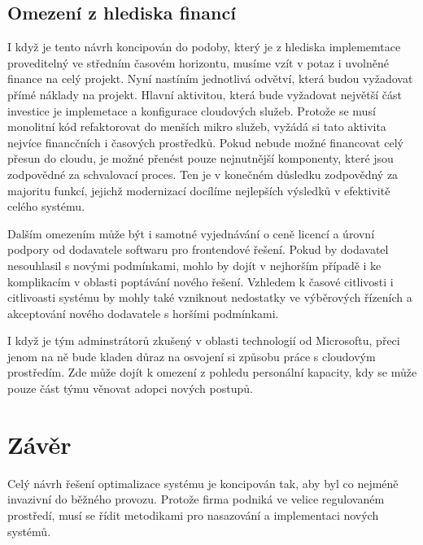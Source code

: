 \documentclass[12pt]{article}
\begin{document}
\begin{sloppypar}
\begin{spacing}{1.15}
        \subsection*{Omezení z hlediska financí}
        I když je tento návrh koncipován do podoby, který je z hlediska
        implememtace proveditelný ve středním časovém horizontu, musíme vzít v
        potaz i uvolněné finance na celý projekt. Nyní nastíním jednotlivá
        odvětví, která budou vyžadovat přímé náklady na projekt. Hlavní
        aktivitou, která bude vyžadovat největší část investice je implemetace a
        konfigurace cloudových služeb. Protože se musí monolitní kód
        refaktorovat do menších mikro služeb, vyžádá si tato aktivita nejvíce
        financčních i časových prostředků. Pokud nebude možné financovat celý
        přesun do cloudu, je možné přenést pouze nejnutnější komponenty, které
        jsou zodpovědné za schvalovací proces. Ten je v konečném důsledku
        zodpovědný za majoritu funkcí, jejichž modernizací docílíme nejlepších
        výsledků v efektivitě celého systému.

        Dalším omezením může být i samotné vyjednávání o ceně licencí a úrovní 
        podpory od dodavatele softwaru pro frontendové řešení. Pokud by
        dodavatel nesouhlasil s novými podmínkami, mohlo by dojít v nejhorším
        případě i ke komplikacím v oblasti poptávání nového řešení. Vzhledem k
        časové citlivosti i citlivoasti systému by mohly také vzniknout
        nedostatky ve výběrových řízeních a akceptování nového dodavatele s
        horšími podmínkami.  
        
        I když je tým adminstrátorů zkušený v oblasti technologií od Microsoftu,
        přeci jenom na ně bude kladen důraz na osvojení si způsobu práce s
        cloudovým prostředím. Zde může dojít k omezení z pohledu personální
        kapacity, kdy se může pouze část týmu věnovat adopci nových postupů.

        \section*{Závěr}
        Celý návrh řešení optimalizace systému je koncipován tak, aby byl co
        nejméně invazivní do běžného provozu. Protože firma podniká ve velice
        regulovaném prostředí, musí se řídit metodikami pro nasazování a
        implementaci nových systémů. 

	\end{spacing}
    \end{sloppypar}
\end{document}
